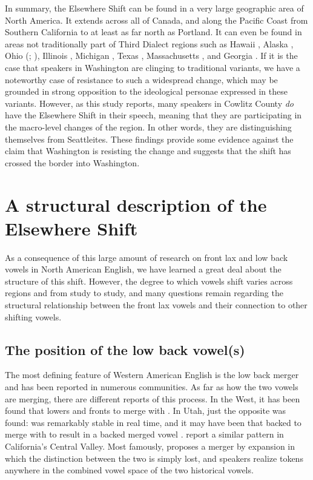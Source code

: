 In summary, the Elsewhere Shift can be found in a very large geographic area of North America. It extends across all of Canada, and along the Pacific Coast from Southern California to at least as far north as Portland. It can even be found in areas not traditionally part of Third Dialect regions such as Hawaii \citep{grama_etal_2012, kirtley_etal_2016}, Alaska \citep{bowie_etal_2012}, Ohio (\citealt{durian_2012_diss}; \citealt[20]{thomas_2001}), Illinois \citep{bigham_2010}, Michigan \citep{nesbitt_mason_2016, mason_2018}, Texas \citep[20--21]{thomas_2001}, Massachusetts \citep{stanford_etal_2019}, and Georgia \citep{stanley_2019_LCUGA6}. If it is the case that speakers in Washington are clinging to traditional variants, we have a noteworthy case of resistance to such a widespread change, which may be grounded in strong opposition to the ideological personae expressed in these variants. However, as this study reports, many speakers in Cowlitz County \textit{do} have the Elsewhere Shift in their speech, meaning that they are participating in the macro-level changes of the region. In other words, they are distinguishing themselves from Seattleites. These findings provide some evidence against the claim that Washington is resisting the change and suggests that the shift has crossed the border into Washington.




\section{A structural description of the Elsewhere Shift}
\label{sec:structure_of_elsewhere_shift}

As a consequence of this large amount of research on front lax and low back vowels in North American English, we have learned a great deal about the structure of this shift. However, the degree to which vowels shift varies across regions and from study to study, and many questions remain regarding the structural relationship between the front lax vowels and their connection to other shifting vowels.

\subsection{The position of the low back vowel(s)}
\label{position_low_back_vowels}

The most defining feature of Western American English is the low back merger \citep[277]{labov_ash_boberg_2006_anae} and has been reported in numerous communities. As far as how the two vowels are merging, there are different reports of this process. In the West, it has been found that \thought lowers and fronts to merge with \lot \citep{hall_lew_2013}. In Utah, just the opposite was found: \thought was remarkably stable in real time, and it may have been \lot that backed to merge with \thought to result in a backed merged vowel \citep{bowie_2017_pads}. \citet{donofrio_etal_2017_pads} report a similar pattern in California's Central Valley. Most famously, \citet{herold_1990_diss} proposes a merger by expansion in which the distinction between the two is simply lost, and speakers realize tokens anywhere in the combined vowel space of the two historical vowels.

